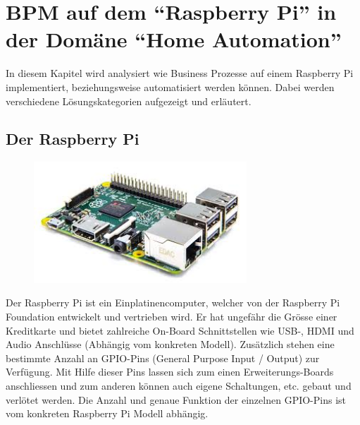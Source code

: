 
\chapter{BPM auf dem "`Raspberry Pi"' in der Domäne "`Home Automation"'}
In diesem Kapitel wird analysiert wie Business Prozesse auf einem Raspberry Pi implementiert, beziehungsweise automatisiert werden können. Dabei werden verschiedene Lösungskategorien aufgezeigt und erläutert.


\section{Der Raspberry Pi}
\begin{figure}
  \centering
  \includegraphics[width=8cm]{./images/RaspberryPi2ModelB}
\end{figure}
  
Der Raspberry Pi ist ein Einplatinencomputer, welcher von der Raspberry Pi Foundation entwickelt und vertrieben wird. Er hat ungefähr die Grösse einer Kreditkarte und bietet zahlreiche On-Board Schnittstellen wie USB-, HDMI und Audio Anschlüsse (Abhängig vom konkreten Modell). Zusätzlich stehen eine bestimmte Anzahl an GPIO-Pins (General Purpose Input / Output) zur Verfügung. Mit Hilfe dieser Pins lassen sich zum einen Erweiterungs-Boards anschliessen und zum anderen können auch eigene Schaltungen, etc. gebaut und verlötet werden. Die Anzahl und genaue Funktion der einzelnen GPIO-Pins ist vom konkreten Raspberry Pi Modell abhängig.


